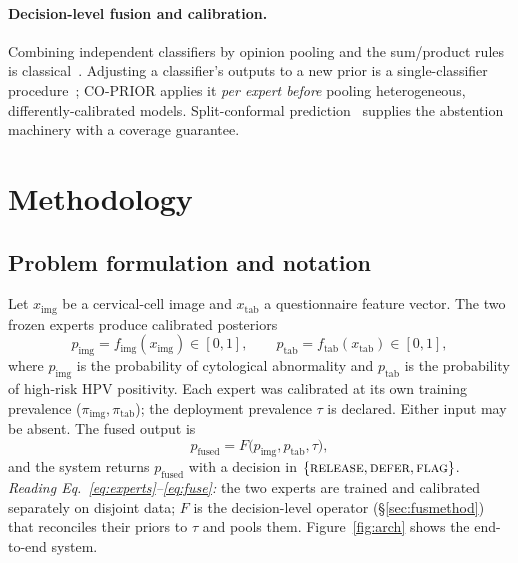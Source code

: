 \documentclass[sigplan,nonacm,screen]{acmart}
\begin{document}
\paragraph{Decision-level fusion and calibration.} Combining independent classifiers by opinion pooling and
the sum/product rules is classical~\cite{kittler1998}. Adjusting a classifier's outputs to a new prior is a
single-classifier procedure~\cite{saerens2002}; CO-PRIOR applies it \emph{per expert before} pooling
heterogeneous, differently-calibrated models. Split-conformal prediction~\cite{angelopoulos2023} supplies the
abstention machinery with a coverage guarantee.

\section{Methodology}\label{sec:method}
\subsection{Problem formulation and notation}\label{sec:problem}
Let $x_{\mathrm{img}}$ be a cervical-cell image and $x_{\mathrm{tab}}$ a questionnaire feature vector. The two
frozen experts produce calibrated posteriors
\begin{equation}\label{eq:experts}
p_{\mathrm{img}}=f_{\mathrm{img}}(x_{\mathrm{img}})\in[0,1],\qquad
p_{\mathrm{tab}}=f_{\mathrm{tab}}(x_{\mathrm{tab}})\in[0,1],
\end{equation}
where $p_{\mathrm{img}}$ is the probability of cytological abnormality and $p_{\mathrm{tab}}$ is the
probability of high-risk HPV positivity. Each expert was calibrated at its own training prevalence
($\pi_{\mathrm{img}},\pi_{\mathrm{tab}}$); the deployment prevalence $\tau$ is declared. Either input may be
absent. The fused output is
\begin{equation}\label{eq:fuse}
p_{\mathrm{fused}}=F\big(p_{\mathrm{img}},p_{\mathrm{tab}},\tau\big),
\end{equation}
and the system returns $p_{\mathrm{fused}}$ with a decision in
$\{\textsc{release},\textsc{defer},\textsc{flag}\}$. \emph{Reading Eq.~\eqref{eq:experts}--\eqref{eq:fuse}:}
the two experts are trained and calibrated separately on disjoint data; $F$ is the decision-level operator
(\S\ref{sec:fusmethod}) that reconciles their priors to $\tau$ and pools them. Figure~\ref{fig:arch} shows the
end-to-end system.
\end{document}
